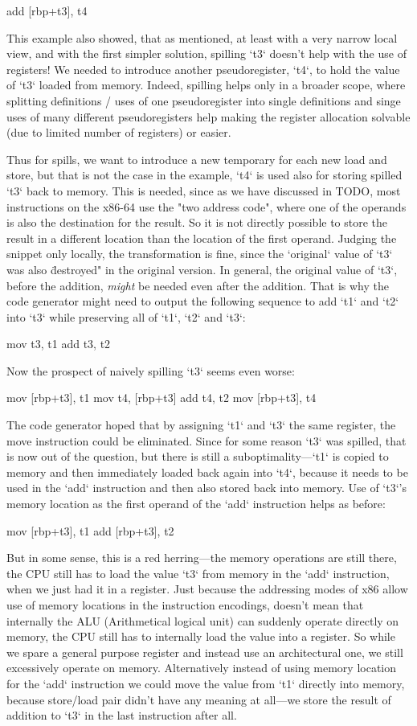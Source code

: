 \begtt
add [rbp+t3], t4
\endtt

This example also showed, that as mentioned, at least with a very narrow local
view, and with the first simpler solution, spilling `t3` doesn't help with the
use of registers! We needed to introduce another pseudoregister, `t4`, to hold
the value of `t3` loaded from memory. Indeed, spilling helps only in a broader
scope, where splitting definitions / uses of one pseudoregister into single
definitions and singe uses of many different pseudoregisters help making the
register allocation solvable (due to limited number of registers) or easier.

Thus for spills, we want to introduce a new temporary for each new load and
store, but that is not the case in the example, `t4` is used also for storing
spilled `t3` back to memory. This is needed, since as we have discussed in TODO,
most instructions on the x86-64 use the "two address code", where one of the
operands is also the destination for the result. So it is not directly possible
to store the result in a different location than the location of the first
operand. Judging the snippet only locally, the transformation is fine, since the
`original` value of `t3` was also \"destroyed" in the original version. In
general, the original value of `t3`, before the addition, {\em might} be needed
even after the addition. That is why the code generator might need to output the
following sequence to add `t1` and `t2` into `t3` while preserving all of `t1`,
`t2` and `t3`:

\begtt
mov t3, t1
add t3, t2
\endtt

Now the prospect of naively spilling `t3` seems even worse:

\begtt
mov [rbp+t3], t1
mov t4, [rbp+t3]
add t4, t2
mov [rbp+t3], t4
\endtt

The code generator hoped that by assigning `t1` and `t3` the same register, the
move instruction could be eliminated. Since for some reason `t3` was spilled,
that is now out of the question, but there is still a suboptimality---`t1` is
copied to memory and then immediately loaded back again into `t4`, because it
needs to be used in the `add` instruction and then also stored back into memory.
Use of `t3`'s memory location as the first operand of the `add` instruction
helps as before:

\begtt
mov [rbp+t3], t1
add [rbp+t3], t2
\endtt

But in some sense, this is a red herring---the memory operations are still
there, the CPU still has to load the value `t3` from memory in the `add`
instruction, when we just had it in a register. Just because the addressing
modes of x86 allow use of memory locations in the instruction encodings, doesn't
mean that internally the ALU (Arithmetical logical unit) can suddenly operate
directly on memory, the CPU still has to internally load the value into a
register. So while we spare a general purpose register and instead use an
architectural one, we still excessively operate on memory. Alternatively instead of
using memory location for the `add` instruction we could move the value from
`t1` directly into memory, because store/load pair didn't have any meaning at
all---we store the result of addition to `t3` in the last instruction after all.

